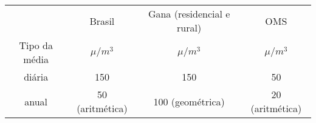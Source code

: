 \begin{tabular}{cccc}
\hline
              & Brasil & Gana (residencial e rural) & OMS \\
Tipo da média & $\mu / m^3$ & $\mu / m^3$ & $\mu / m^3$          \\
\hline
diária   & 150              & 150              &  50             \\
anual    &  50 (aritmética) & 100 (geométrica) &  20 (aritmética) \\
\hline
\end{tabular}
